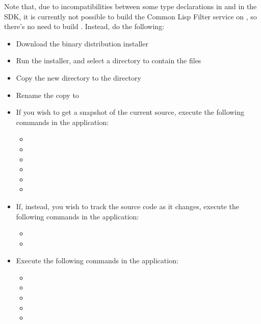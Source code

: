 \tertiaryEnd
{}
Note that, due to incompatibilities between some type declarations in \textbf{\ECL} and in
the \win{} SDK, it is currently not possible to build the Common Lisp Filter service on
\win, so there's no need to build \textbf{\ECL}.
Instead, do the following:
\begin{itemize}
\item Download the
{\win{} binary distribution installer}
\item\exSp{}Run the installer, and select a directory to contain the \ECL{} files
\item\exSp{}Copy the new directory to the directory
\item\exSp{}Rename the copy to 
\end{itemize}
\tertiaryEnd
{}
\begin{itemize}
\item If you wish to get a snapshot of the current source, execute the following
commands in the  application:
\begin{itemize}
\item {}
\item\exSp{}
\item\exSp{}
\item\exSp{}
\item\exSp{}
\item\exSp{}
\end{itemize}
\item\exSp{}If, instead, you wish to track the source code as it changes, execute the
following commands in the  application:
\begin{itemize}
\item {}
\item\exSp{}
\end{itemize}
\item\exSp{}Execute the following commands in the  application:
\begin{itemize}
\item \exSp{}
\item\exSp{}
\item\exSp{}
\item\exSp{}
\item\exSp{}
\end{itemize}
\end{itemize}

